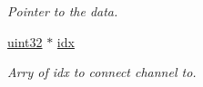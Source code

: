 \begin{CompactItemize}
\begin{CompactList}\small\item\em Pointer to the data. \item\end{CompactList}\item 
\hypertarget{structcsimInputChannel_o5}{
\hyperlink{globaldefinitions_8h_a6}{uint32} $\ast$ \hyperlink{structcsimInputChannel_o5}{idx}}
\label{structcsimInputChannel_o5}

\begin{CompactList}\small\item\em Arry of idx to connect channel to. \item\end{CompactList}\end{CompactItemize}
